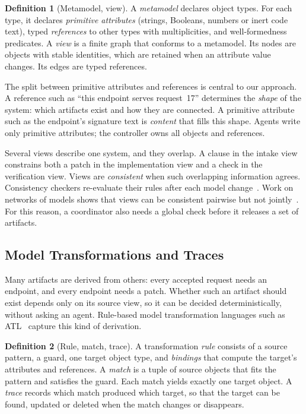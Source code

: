 \documentclass[10pt,journal,compsoc]{IEEEtran}
\theoremstyle{plain}
\theoremstyle{definition}
\newtheorem{definition}{Definition}
\begin{document}
\begin{definition}[Metamodel, view]\label{def:view}
A \emph{metamodel} declares object types. For each type, it declares \emph{primitive attributes} (strings, Booleans, numbers or inert code text), typed \emph{references} to other types with multiplicities, and well-formedness predicates. A \emph{view} is a finite graph that conforms to a metamodel. Its nodes are objects with stable identities, which are retained when an attribute value changes. Its edges are typed references.
\end{definition}

The split between primitive attributes and references is central to our approach. A reference such as ``this endpoint serves request~17'' determines the \emph{shape} of the system: which artifacts exist and how they are connected. A primitive attribute such as the endpoint's signature text is \emph{content} that fills this shape. Agents write only primitive attributes; the controller owns all objects and references.

Several views describe one system, and they overlap. A clause in the intake view constrains both a patch in the implementation view and a check in the verification view. Views are \emph{consistent} when such overlapping information agrees. Consistency checkers re-evaluate their rules after each model change~\cite{egyed2006instant,egyed2011tracking}. Work on networks of models shows that views can be consistent pairwise but not jointly~\cite{stevens,klare}. For this reason, a coordinator also needs a global check before it releases a set of artifacts.

\subsection{Model Transformations and Traces}\label{sec:bg-transformations}
Many artifacts are derived from others: every accepted request needs an endpoint, and every endpoint needs a patch. Whether such an artifact should exist depends only on its source view, so it can be decided deterministically, without asking an agent. Rule-based model transformation languages such as ATL~\cite{atl} capture this kind of derivation.

\begin{definition}[Rule, match, trace]\label{def:rule}
A transformation \emph{rule} consists of a source pattern, a guard, one target object type, and \emph{bindings} that compute the target's attributes and references. A \emph{match} is a tuple of source objects that fits the pattern and satisfies the guard. Each match yields exactly one target object. A \emph{trace} records which match produced which target, so that the target can be found, updated or deleted when the match changes or disappears.
\end{definition}
\end{document}
